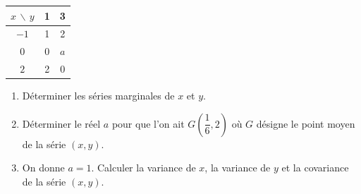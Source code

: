 \documentclass[11pt]{article}
\begin{document}
\begin{center}
\renewcommand{\arraystretch}{1.3}
\begin{tabular}{|c|c|c|}
\hline
$x\,\backslash\,y$ & 1 & 3 \\
\hline
$-1$ & 1 & 2 \\
\hline
$0$ & 0 & $a$ \\
\hline
$2$ & 2 & 0 \\
\hline
\end{tabular}
\end{center}

\begin{enumerate}
  \item Déterminer les séries marginales de $x$ et $y$.
  \item Déterminer le réel $a$ pour que l'on ait $G\!\left(\dfrac{1}{6}, 2\right)$ où $G$ désigne le point moyen de la série $(x, y)$.
  \item On donne $a = 1$. Calculer la variance de $x$, la variance de $y$ et la covariance de la série $(x, y)$.
\end{enumerate}
\end{document}
